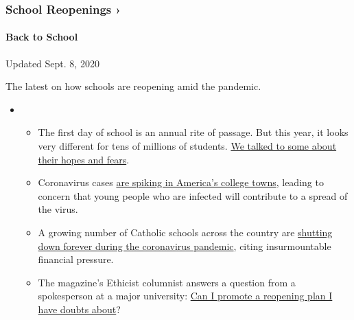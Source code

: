 \href{https://www.nytimes3xbfgragh.onion/spotlight/schools-reopening?action=click\&pgtype=Article\&state=default\&region=MAIN_CONTENT_3\&context=storylines_keepup}{}

\hypertarget{school-reopenings-}{%
\subsubsection{School Reopenings ›}\label{school-reopenings-}}

\hypertarget{back-to-school}{%
\paragraph{Back to School}\label{back-to-school}}

Updated Sept. 8, 2020

The latest on how schools are reopening amid the pandemic.

\begin{itemize}
\item
  \begin{itemize}
  \tightlist
  \item
    The first day of school is an annual rite of passage. But this year,
    it looks very different for tens of millions of students.
    \href{https://www.nytimes3xbfgragh.onion/2020/09/05/us/virtual-return-to-school-covid.html?action=click\&pgtype=Article\&state=default\&region=MAIN_CONTENT_3\&context=storylines_keepup}{We
    talked to some about their hopes and fears}.
  \item
    Coronavirus cases
    \href{https://www.nytimes3xbfgragh.onion/2020/09/06/us/colleges-coronavirus-students.html?action=click\&pgtype=Article\&state=default\&region=MAIN_CONTENT_3\&context=storylines_keepup}{are
    spiking in America's college towns}, leading to concern that young
    people who are infected will contribute to a spread of the virus.
  \item
    A growing number of Catholic schools across the country are
    \href{https://www.nytimes3xbfgragh.onion/2020/09/05/us/catholic-school-closings.html?action=click\&pgtype=Article\&state=default\&region=MAIN_CONTENT_3\&context=storylines_keepup}{shutting
    down forever during the coronavirus pandemic}, citing insurmountable
    financial pressure.
  \item
    The magazine's Ethicist columnist answers a question from a
    spokesperson at a major university:
    \href{https://www.nytimes3xbfgragh.onion/2020/09/08/magazine/university-reopening-safety-ethics.html?action=click\&pgtype=Article\&state=default\&region=MAIN_CONTENT_3\&context=storylines_keepup}{Can
    I promote a reopening plan I have doubts about}?
  \end{itemize}
\end{itemize}

